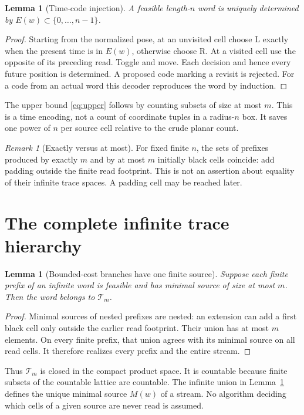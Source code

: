 \documentclass[11pt]{article}
\newtheorem{lemma}[theorem]{Lemma}
\theoremstyle{definition}\newtheorem{definition}[theorem]{Definition}
\theoremstyle{remark}\newtheorem{remark}[theorem]{Remark}
\newcommand{\Tr}{\mathcal T}
\newcommand{\Rr}{\mathrm R}
\newcommand{\Ll}{\mathrm L}
\begin{document}
\begin{lemma}[Time-code injection]\label{lem:code}
A feasible length-$n$ word is uniquely determined by $E(w)\subset\{0,\ldots,n-1\}$.
\end{lemma}
\begin{proof}
Starting from the normalized pose, at an unvisited cell choose $\Ll$ exactly
when the present time is in $E(w)$, otherwise choose $\Rr$. At a visited cell
use the opposite of its preceding read. Toggle and move. Each decision and
hence every future position is determined. A proposed code marking a revisit
is rejected. For a code from an actual word this decoder reproduces the word
by induction.
\end{proof}
The upper bound \eqref{eq:upper} follows by counting subsets of size at most $m$.
This is a time encoding, not a count of coordinate tuples in a radius-$n$ box.
It saves one power of $n$ per source cell relative to the crude planar count.

\begin{remark}[Exactly versus at most]
For fixed finite $n$, the sets of prefixes produced by exactly $m$ and by at
most $m$ initially black cells coincide: add padding outside the finite read
footprint. This is not an assertion about equality of their infinite trace
spaces. A padding cell may be reached later.
\end{remark}

\section{The complete infinite trace hierarchy}
\begin{lemma}[Bounded-cost branches have one finite source]\label{lem:branch}
Suppose each finite prefix of an infinite word is feasible and has minimal
source of size at most $m$. Then the word belongs to $\Tr_m$.
\end{lemma}
\begin{proof}
Minimal sources of nested prefixes are nested: an extension can add a first
black cell only outside the earlier read footprint. Their union has at most
$m$ elements. On every finite prefix, that union agrees with its minimal source
on all read cells. It therefore realizes every prefix and the entire stream.
\end{proof}
Thus $\Tr_m$ is closed in the compact product space. It is countable because
finite subsets of the countable lattice are countable. The infinite union in
Lemma~\ref{lem:branch} defines the unique minimal source $M(w)$ of a stream.
No algorithm deciding which cells of a given source are never read is assumed.
\end{document}
